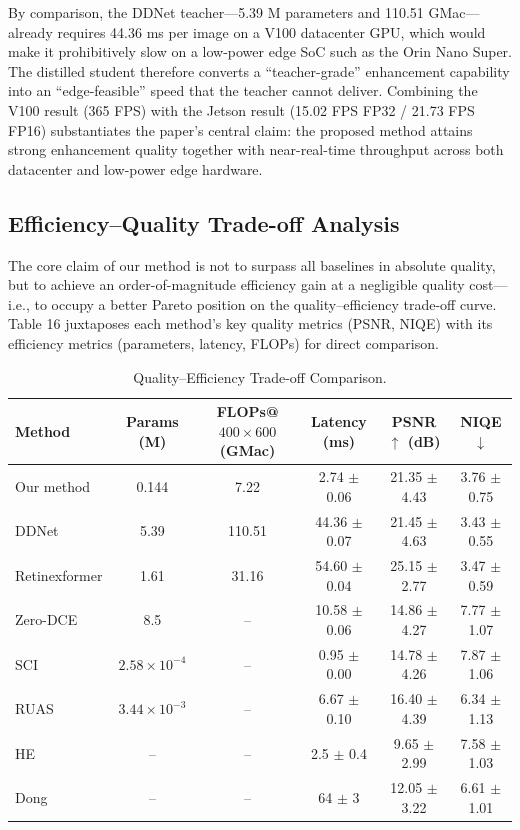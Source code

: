 \documentclass[sensors,article,submit,moreauthors]{Definitions/mdpi}
\begin{document}
By comparison, the DDNet teacher---5.39 M parameters and 110.51 GMac---already requires 44.36 ms per image on a V100 datacenter GPU, which would make it prohibitively slow on a low-power edge SoC such as the Orin Nano Super. The distilled student therefore converts a ``teacher-grade'' enhancement capability into an ``edge-feasible'' speed that the teacher cannot deliver. Combining the V100 result (365 FPS) with the Jetson result (15.02 FPS FP32 / 21.73 FPS FP16) substantiates the paper's central claim: the proposed method attains strong enhancement quality together with near-real-time throughput across both datacenter and low-power edge hardware.

\subsection{Efficiency--Quality Trade-off Analysis}

The core claim of our method is not to surpass all baselines in absolute quality, but to achieve an order-of-magnitude efficiency gain at a negligible quality cost---i.e., to occupy a better Pareto position on the quality--efficiency trade-off curve. Table 16 juxtaposes each method's key quality metrics (PSNR, NIQE) with its efficiency metrics (parameters, latency, FLOPs) for direct comparison.

\begin{table}[H]
\caption{Quality--Efficiency Trade-off Comparison.\label{tab16}}
\begin{tabularx}{\textwidth}{LCCCCC}
\toprule
\textbf{Method}	& \textbf{Params (M)}	& \textbf{FLOPs@$400\times600$ (GMac)}	& \textbf{Latency (ms)}	& \textbf{PSNR$\uparrow$ (dB)}	& \textbf{NIQE$\downarrow$}\\
\midrule
Our method	& 0.144	& 7.22	& 2.74 $\pm$ 0.06	& 21.35 $\pm$ 4.43	& 3.76 $\pm$ 0.75\\
DDNet \cite{ref25}	& 5.39	& 110.51	& 44.36 $\pm$ 0.07	& 21.45 $\pm$ 4.63	& 3.43 $\pm$ 0.55\\
Retinexformer \cite{ref34}	& 1.61	& 31.16	& 54.60 $\pm$ 0.04	& 25.15 $\pm$ 2.77	& 3.47 $\pm$ 0.59\\
Zero-DCE \cite{ref26}	& 8.5	& --	& 10.58 $\pm$ 0.06	& 14.86 $\pm$ 4.27	& 7.77 $\pm$ 1.07\\
SCI \cite{ref27}	& $2.58\times10^{-4}$	& --	& 0.95 $\pm$ 0.00	& 14.78 $\pm$ 4.26	& 7.87 $\pm$ 1.06\\
RUAS \cite{ref9}	& $3.44\times10^{-3}$	& --	& 6.67 $\pm$ 0.10	& 16.40 $\pm$ 4.39	& 6.34 $\pm$ 1.13\\
HE \cite{ref28}	& --	& --	& 2.5 $\pm$ 0.4	& 9.65 $\pm$ 2.99	& 7.58 $\pm$ 1.03\\
Dong \cite{ref29}	& --	& --	& 64 $\pm$ 3	& 12.05 $\pm$ 3.22	& 6.61 $\pm$ 1.01\\
\bottomrule
\end{tabularx}
\end{table}
\end{document}
